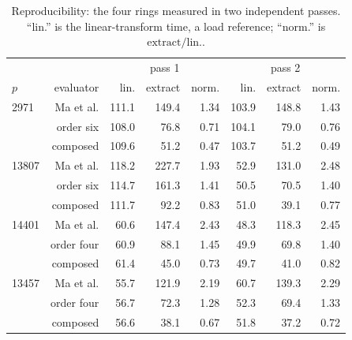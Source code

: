 \begin{table}[t]\centering\caption{Reproducibility: the four rings measured in two independent passes. ``lin.'' is the linear-transform time, a load reference; ``norm.'' is $\mathrm{extract}/\mathrm{lin.}$.}\label{tab:passes}\scriptsize\setlength{\tabcolsep}{3pt}
\begin{tabular}{@{}lr|rrr|rrr@{}}\toprule
 & & \multicolumn{3}{c|}{pass 1} & \multicolumn{3}{c}{pass 2}\\ $p$ & evaluator & lin. & extract & norm. & lin. & extract & norm.\\\midrule
2971 & Ma et al. & 111.1 & 149.4 & 1.34 & 103.9 & 148.8 & 1.43\\
 & order six & 108.0 & 76.8 & 0.71 & 104.1 & 79.0 & 0.76\\
 & composed & 109.6 & 51.2 & 0.47 & 103.7 & 51.2 & 0.49\\
13807 & Ma et al. & 118.2 & 227.7 & 1.93 & 52.9 & 131.0 & 2.48\\
 & order six & 114.7 & 161.3 & 1.41 & 50.5 & 70.5 & 1.40\\
 & composed & 111.7 & 92.2 & 0.83 & 51.0 & 39.1 & 0.77\\
14401 & Ma et al. & 60.6 & 147.4 & 2.43 & 48.3 & 118.3 & 2.45\\
 & order four & 60.9 & 88.1 & 1.45 & 49.9 & 69.8 & 1.40\\
 & composed & 61.4 & 45.0 & 0.73 & 49.7 & 41.0 & 0.82\\
13457 & Ma et al. & 55.7 & 121.9 & 2.19 & 60.7 & 139.3 & 2.29\\
 & order four & 56.7 & 72.3 & 1.28 & 52.3 & 69.4 & 1.33\\
 & composed & 56.6 & 38.1 & 0.67 & 51.8 & 37.2 & 0.72\\
\bottomrule\end{tabular}\end{table}
